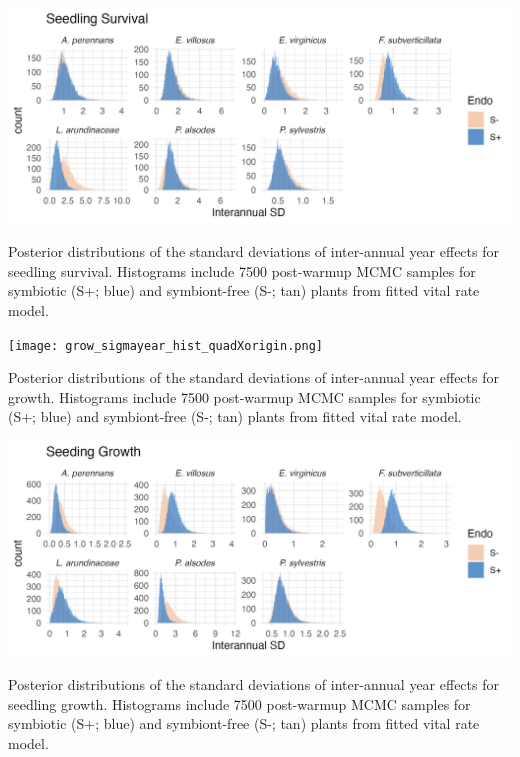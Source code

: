 \documentclass[lineno, sn-basic]{sn-jnl}%
\begin{document}
\begin{myfigure}[H]
	\centering
	\includegraphics[width=.9\linewidth]{seedsurv_sigmayear_hist.png}
	\caption[Posterior distributions of the standard deviations of inter-annual year effects for seedling survival]{Posterior distributions of the standard deviations of inter-annual year effects for seedling survival. Histograms include 7500 post-warmup MCMC samples for symbiotic (S+; blue) and symbiont-free (S-; tan) plants from fitted vital rate model.}
\end{myfigure}


\begin{myfigure}[H]
	\centering
	\texttt{[image: grow\_sigmayear\_hist\_quadXorigin.png]}
	\caption[Posterior distributions of the standard deviations of inter-annual year effects for growth]{Posterior distributions of the standard deviations of inter-annual year effects for growth. Histograms include 7500 post-warmup MCMC samples for symbiotic (S+; blue) and symbiont-free (S-; tan) plants from fitted vital rate model.}
\end{myfigure}


\begin{myfigure}[H]
	\centering
	\includegraphics[width=.9\linewidth]{seedgrow_sigmayear_hist.png}
	\caption[Posterior distributions of the standard deviations of inter-annual year effects for seedling growth]{Posterior distributions of the standard deviations of inter-annual year effects for seedling growth. Histograms include 7500 post-warmup MCMC samples for symbiotic (S+; blue) and symbiont-free (S-; tan) plants from fitted vital rate model.}
\end{myfigure}
\end{document}
